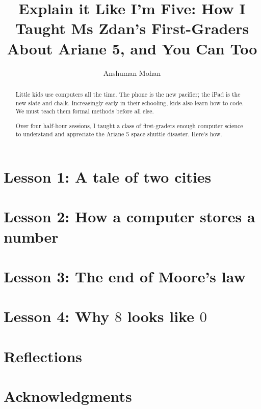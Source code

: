 \documentclass[sigplan,review]{acmart}
\begin{document}
\title[Explain it Like I'm Five]{Explain it Like I'm Five: How I Taught Ms Zdan's First-Graders About Ariane 5, and You Can Too}

\author{Anshuman Mohan}

\begin{abstract}

Little kids use computers all the time.
The phone is the new pacifier; the iPad is the new slate and chalk.
Increasingly early in their schooling, kids also learn how to code.
We must teach them formal methods before all else.

Over four half-hour sessions, I taught a class of first-graders enough computer science to understand and appreciate the Ariane 5 space shuttle disaster.
Here's how.

\end{abstract}

\maketitle

\section*{Lesson 1: A tale of two cities}

\section*{Lesson 2: How a computer stores a number}

\section*{Lesson 3: The end of Moore's law}

\section*{Lesson 4: Why $8$ looks like $0$}

\section*{Reflections}



\section*{Acknowledgments}
\end{document}
